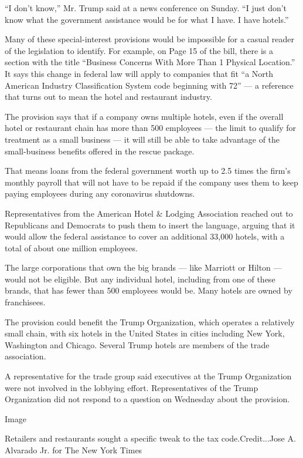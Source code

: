 ``I don't know,'' Mr. Trump said at a news conference on Sunday. ``I
just don't know what the government assistance would be for what I have.
I have hotels.''

Many of these special-interest provisions would be impossible for a
casual reader of the legislation to identify. For example, on Page 15 of
the bill, there is a section with the title ``Business Concerns With
More Than 1 Physical Location.'' It says this change in federal law will
apply to companies that fit ``a North American Industry Classification
System code beginning with 72'' --- a reference that turns out to mean
the hotel and restaurant industry.

The provision says that if a company owns multiple hotels, even if the
overall hotel or restaurant chain has more than 500 employees --- the
limit to qualify for treatment as a small business --- it will still be
able to take advantage of the small-business benefits offered in the
rescue package.

That means loans from the federal government worth up to 2.5 times the
firm's monthly payroll that will not have to be repaid if the company
uses them to keep paying employees during any coronavirus shutdowns.

Representatives from the American Hotel \& Lodging Association reached
out to Republicans and Democrats to push them to insert the language,
arguing that it would allow the federal assistance to cover an
additional 33,000 hotels, with a total of about one million employees.

The large corporations that own the big brands --- like Marriott or
Hilton --- would not be eligible. But any individual hotel, including
from one of these brands, that has fewer than 500 employees would be.
Many hotels are owned by franchisees.

The provision could benefit the Trump Organization, which operates a
relatively small chain, with six hotels in the United States in cities
including New York, Washington and Chicago. Several Trump hotels are
members of the trade association.

A representative for the trade group said executives at the Trump
Organization were not involved in the lobbying effort. Representatives
of the Trump Organization did not respond to a question on Wednesday
about the provision.

Image

Retailers and restaurants sought a specific tweak to the tax
code.Credit...Jose A. Alvarado Jr. for The New York Times

